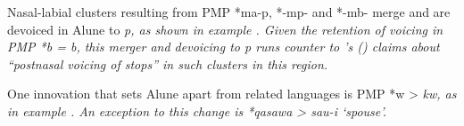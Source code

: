 Nasal-labial clusters resulting from PMP *ma-p,
*-mp- and *-mb- merge
and are devoiced in Alune to \it{p},
as shown in example .
Given the retention of voicing in PMP *b = \it{b},
this merger and devoicing to \it{p} runs
counter to \citeauthor{Blust2009}’s (\citeyear[72]{Blust2009})
claims about “postnasal voicing of stops” in such clusters
in this region.


One innovation that sets Alune apart
from related languages is
PMP *w > \it{kw},
as in example .
An exception to this change
is *qasawa > \it{sau-i} ‘spouse’.
\mbox{}\\

